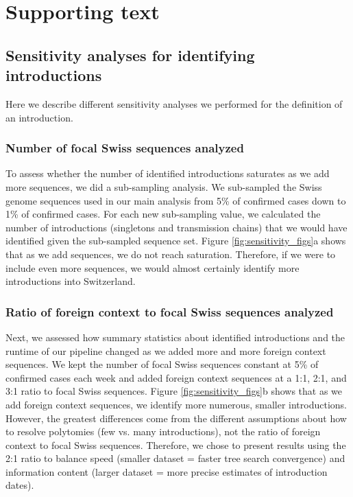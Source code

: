 \documentclass[9pt,twoside,lineno]{pnas-new}
\begin{document}
\section{Supporting text}

\subsection{Sensitivity analyses for identifying introductions}
Here we describe different sensitivity analyses we performed for the definition of an introduction. 

\subsubsection{Number of focal Swiss sequences analyzed}
To assess whether the number of identified introductions saturates as we add more sequences, we did a sub-sampling analysis. We sub-sampled the Swiss genome sequences used in our main analysis from 5\% of confirmed cases down to 1\% of confirmed cases. For each new sub-sampling value, we calculated the number of introductions (singletons and transmission chains) that we would have identified given the sub-sampled sequence set. Figure \ref{fig:sensitivity_figs}a shows that as we add sequences, we do not reach saturation. Therefore, if we were to include even more sequences, we would almost certainly identify more introductions into Switzerland.

\subsubsection{Ratio of foreign context to focal Swiss sequences analyzed}
Next, we assessed how summary statistics about identified introductions and the runtime of our pipeline changed as we added more and more foreign context sequences. We kept the number of focal Swiss sequences constant at 5\% of confirmed cases each week and added foreign context sequences at a 1:1, 2:1, and 3:1 ratio to focal Swiss sequences. Figure \ref{fig:sensitivity_figs}b shows that as we add foreign context sequences, we identify more numerous, smaller introductions. However, the greatest differences come from the different assumptions about how to resolve polytomies (few vs. many introductions), not the ratio of foreign context to focal Swiss sequences. Therefore, we chose to present results using the 2:1 ratio to balance speed (smaller dataset = faster tree search convergence) and information content (larger dataset = more precise estimates of introduction dates).
\end{document}
